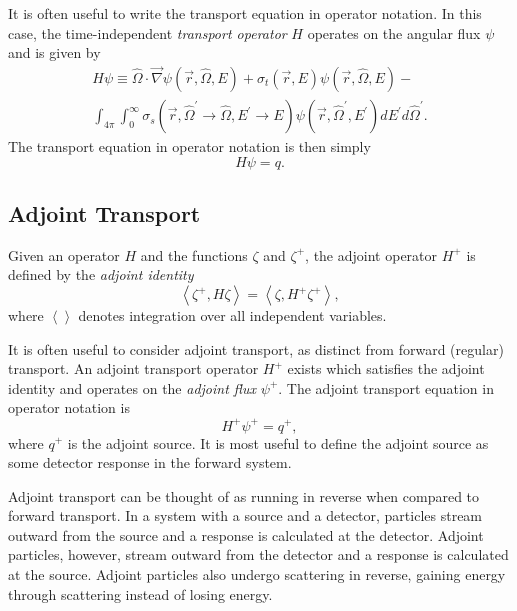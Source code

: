 It is often useful to write the transport equation in operator notation.
In this case, the time-independent \textit{transport operator} $H$ operates on the angular flux $\psi$ and is given by
\begin{multline}\label{eq:bg:rt:transport-operator}
  H\psi \equiv
  \hat{\Omega}\cdot\vec{\nabla}\psi\left(\vec{r},\hat{\Omega},E\right) +
  \sigma_t\left(\vec{r},E\right)\psi\left(\vec{r},\hat{\Omega},E\right) - \\
  \int_{4\pi}\int_0^\infty\sigma_s\left(\vec{r},\hat{\Omega}^\prime\rightarrow\hat{\Omega},E^\prime\rightarrow E\right)\psi\left(\vec{r},\hat{\Omega}^\prime,E^\prime\right)dE^\prime d\hat{\Omega}^\prime.
\end{multline}
The transport equation in operator notation is then simply
\begin{equation}\label{eq:bg:rt:transport-opnot}
  H\psi = q.
\end{equation}

\subsection{Adjoint Transport}
\label{sec:bg:rt:at}

Given an operator $H$ and the functions $\zeta$ and $\zeta^+$, the adjoint operator $H^+$ is defined by the \textit{adjoint identity}
\begin{equation}\label{eq:bg:rt:adjoint-identity}
  \left<\zeta^+,H\zeta\right> =
  \left<\zeta,H^+\zeta^+\right>,
\end{equation}
where $\left<\right>$ denotes integration over all independent variables.

It is often useful to consider adjoint transport, as distinct from forward (regular) transport.
An adjoint transport operator $H^+$ exists which satisfies the adjoint identity and operates on the \textit{adjoint flux} $\psi^+$.
The adjoint transport equation in operator notation is
\begin{equation}\label{eq:bg:rt:adjtransport-opnot}
  H^+\psi^+ = q^+,
\end{equation}
where $q^+$ is the adjoint source.
It is most useful to define the adjoint source as some detector response in the forward system.

Adjoint transport can be thought of as running in reverse when compared to forward transport.
In a system with a source and a detector, particles stream outward from the source and a response is calculated at the detector.
Adjoint particles, however, stream outward from the detector and a response is calculated at the source.
Adjoint particles also undergo scattering in reverse, gaining energy through scattering instead of losing energy.

